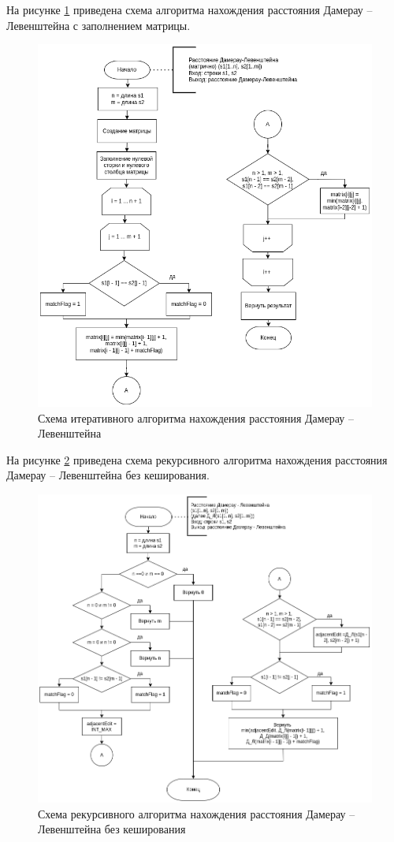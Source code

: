 На рисунке \ref{img:damerau} приведена схема алгоритма нахождения расстояния Дамерау -- Левенштейна с заполнением матрицы.
\begin{figure}[h]
	\centering
	\includegraphics[width=170mm]{matrixDL}
	\caption{Схема итеративного алгоритма нахождения расстояния Дамерау -- Левенштейна}
	\label{img:damerau}
\end{figure}
\newpage
На рисунке \ref{img:recursive} приведена схема рекурсивного алгоритма нахождения расстояния Дамерау -- Левенштейна без кеширования. 
\begin{figure}[h]
	\centering
	\includegraphics[width=175mm]{damerau}
	\caption{Схема рекурсивного алгоритма нахождения расстояния Дамерау -- Левенштейна без кеширования}
	\label{img:recursive}
\end{figure}
